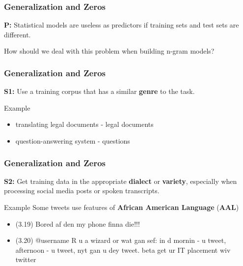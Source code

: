 \documentclass[13.5pt,aspecratio=169]{beamer}
\begin{document}
    
    \begin{frame}
        \frametitle{Generalization and Zeros}
            \begin{block}{}
                \textbf{P:} Statistical models are useless as predictors if training sets and test sets are different.
            \end{block}
            \Large{How should we deal with this problem when building n-gram models?}
    \end{frame}
    
    
    \begin{frame}
            \frametitle{Generalization and Zeros}
        \begin{block}{}
                \textbf{S1:} Use a training corpus that has a similar \textbf{genre} to the task.
        \end{block}
            \pause
        \begin{exampleblock}{Example}
            \begin{itemize}
                \item translating legal documents - legal documents
                    \item question-answering system - questions
            \end{itemize}
        \end{exampleblock}
    \end{frame}
    
    
    \begin{frame}
            \frametitle{Generalization and Zeros}
        \begin{block}{}
                \textbf{S2:} Get training data in the appropriate \textbf{dialect} or \textbf{variety}, especially when processing social media posts or spoken transcripts.
        \end{block}
            \pause
        \begin{exampleblock}{Example}
            Some tweets use features of \textbf{African American Language} (\textbf{AAL})
            \begin{itemize}
                \item (3.19) Bored af den my phone finna die!!!
                    \item (3.20) @username R u a wizard or wat gan sef: in d mornin - u tweet, afternoon - u tweet, nyt gan u dey tweet. beta get ur IT placement wiv twitter
            \end{itemize}
        \end{exampleblock}
    \end{frame}
    
\end{document}
